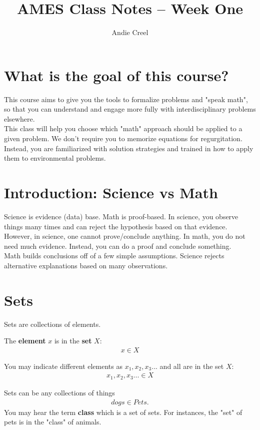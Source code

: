 \documentclass[12pt]{article}
\title{AMES Class Notes -- Week One}
\author{Andie Creel}
\begin{document}
\maketitle
\section{What is the goal of this course?}
This course aims to give you the tools to formalize problems and "speak math", so that you can understand and engage more fully with interdisciplinary problems elsewhere. \\

This class will help you choose which "math" approach should be applied to a given problem. We don't require you to memorize equations for regurgitation. Instead, you are familiarized with solution strategies and trained in how to apply them to environmental problems. \\

\section{Introduction: Science vs Math}
Science is evidence (data) base. Math is proof-based. In science, you observe things many times and can reject the hypothesis based on that evidence. However, in science, one cannot prove/conclude anything. In math, you do not need much evidence. Instead, you can do a proof and conclude something. \\

Math builds conclusions off of a few simple assumptions. Science rejects alternative explanations based on many observations.  

\section{Sets}
Sets are collections of elements.  

The \textbf{element} $x$ is in the \textbf{set} $X$:
\begin{align*}
    x \in X
\end{align*}

You may indicate different elements as $x_1, x_2, x_3...$ and all are in the set $X$:
\begin{align*}
    x_1, x_2, x_3... \in X
\end{align*}

Sets can be any collections of things 
\begin{align*}
    dogs \in Pets.
\end{align*}
You may hear the term \textbf{class} which is a set of sets. For instances, the "set" of pets is in the "class" of animals. \\
\end{document}
